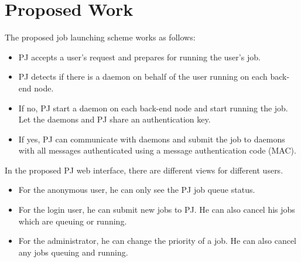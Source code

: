 \documentclass[10pt]{article}
\begin{document}
\section{Proposed Work}
The proposed job launching scheme works as follows:
\begin{itemize}
\item PJ accepts a user's request and prepares for running the user's job.
\item PJ detects if there is a daemon on behalf of the user running on each back-end node. 
\item If no, PJ start a daemon on each back-end node and start running the job. Let the daemons and PJ share an authentication key.
\item If yes, PJ can communicate with daemons and submit the job to daemons with all messages authenticated using a message authentication code (MAC).
\end{itemize}

In the proposed PJ web interface, there are different views for different users.
\begin{itemize}
\item For the anonymous user, he can only see the PJ job queue status.
\item For the login user, he can submit new jobs to PJ.  He can also cancel his jobs which are queuing or running.
\item For the administrator, he can change the priority of a job. He can also cancel any jobs queuing and running. 
\end{itemize}
%
%
\end{document}
